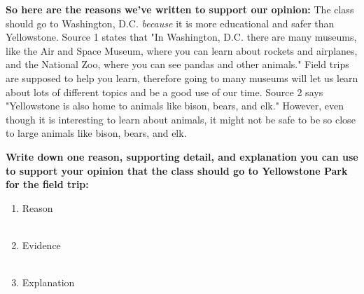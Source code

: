 \documentclass[12pt]{article}
\begin{document}
\begin{tcolorbox}[colframe=black!60, colback=white, 
coltitle=black, colbacktitle=black!15, fonttitle=\bfseries\Large, 
title=Examples, halign title=center, left=10pt, right=10pt, top=10pt, bottom=15pt]
\textbf{So here are the reasons we've written to support our opinion:} The class should go to Washington, D.C. \textit{because} it is more educational and safer than Yellowstone. Source 1 states that "In Washington, D.C. there are many museums, like the Air and Space Museum, where you can learn about rockets and airplanes, and the National Zoo, where you can see pandas and other animals." Field trips are supposed to help you learn, therefore going to many museums will let us learn about lots of different topics and be a good use of our time. Source 2 says "Yellowstone is also home to animals like bison, bears, and elk." However, even though it is interesting to learn about animals, it might not be safe to be so close to large animals like bison, bears, and elk.




 


     \end{tcolorbox}
\vspace{1em}



\begin{tcolorbox}[colframe=black!60, colback=white, 
coltitle=black, colbacktitle=black!15, fonttitle=\bfseries\Large, 
title=Guided Practice, halign title=center, left=10pt, right=10pt, top=10pt, bottom=15pt]
\textbf{Write down one reason, supporting detail, and explanation you can use to support your opinion that the class should go to Yellowstone Park for the field trip:}
\begin{enumerate}[itemsep=3em] %
    \item Reason
    \\[0.8cm] \underline{\hspace{14.3cm}}  
    \\[0.8cm] \underline{\hspace{14.3cm}} 
    \item Evidence
     \\[0.8cm] \underline{\hspace{14.3cm}}  
    \\[0.8cm] \underline{\hspace{14.3cm}} 
    \item Explanation
       \\[0.8cm] \underline{\hspace{14.3cm}}  
    \\[0.8cm] \underline{\hspace{14.3cm}} 

\vspace{1.5em}\end{enumerate}
\end{tcolorbox}
\vspace{2em}
\end{document}
